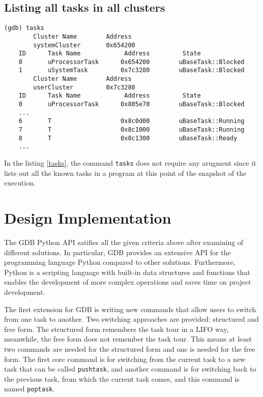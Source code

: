\subsection{Listing all tasks in all clusters}
\begin{lstlisting}[caption={\text{tasks} command}, label={tasks},
basicstyle=\small]
(gdb) tasks
        Cluster Name        Address
        systemCluster       0x654200
    ID      Task Name            Address         State
    0       uProcessorTask      0x654200        uBaseTask::Blocked
    1       uSystemTask         0x7c3280        uBaseTask::Blocked
        Cluster Name        Address
        userCluster         0x7c3280
    ID      Task Name            Address         State
    0       uProcessorTask      0x805e70        uBaseTask::Blocked
    ...
    6       T                   0x8c0d00        uBaseTask::Running
    7       T                   0x8c1000        uBaseTask::Running
    8       T                   0x8c1300        uBaseTask::Ready
    ...
\end{lstlisting}
In the listing \ref{tasks}, the command \verb|tasks| does not require any
arugment since it lists out all the known tasks in a \uCPPS program at this
point of the snapshot of the execution.

\section{Design Implementation}
The GDB Python API satifies all the given criteria above after examining of different solutions. In particular, GDB provides an extensive API for
the programming language Python compared to other solutions. Furthermore, Python is a scripting language with built-in
data structures and functions that enables the development of more complex
operations and saves time on project development.

The first extension for GDB is writing new commands that allow
users to switch from one \uCCS task to another. Two switching approaches are
provided: structured and free form. The structured form remembers the task tour in a
LIFO way, meanwhile, the free form does not remember the task tour. This means
at least two commands are needed for the structured form and one is needed for
the free form. The first core command is for switching from the current task to
a new task that can be called \verb|pushtask|, and another command
is for switching back to the previous task, from which the current task comes, and this command is named \verb|poptask|.


